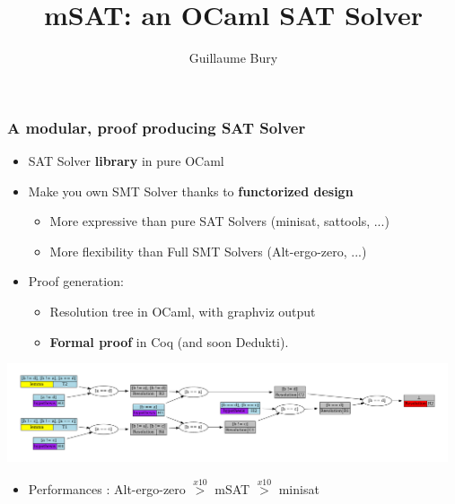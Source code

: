 \documentclass[xcolor={usenames,dvipsnames}]{beamer}
\title{mSAT: an OCaml SAT Solver}
\author{Guillaume Bury}
\institute{Université Paris Diderot; \inria{}; LSV, ENS Cachan}
\begin{document}
\begin{frame}
  \frametitle{A modular, proof producing SAT Solver}

  \begin{itemize}
    \item SAT Solver \textbf{library} in pure OCaml
    \item Make you own SMT Solver thanks to \textbf{functorized design}
      \begin{itemize}
        \item More expressive than pure SAT Solvers (minisat, sattools, ...)
        \item More flexibility than Full SMT Solvers (Alt-ergo-zero, ...)
      \end{itemize}
    \item Proof generation:
      \begin{itemize}
        \item Resolution tree in OCaml, with graphviz output
        \item \textbf{Formal proof} in Coq (and soon Dedukti).
      \end{itemize}
  \end{itemize}
  \hspace*{-1cm}\includegraphics[width=13cm]{proof}
  \begin{itemize}
    \item Performances : Alt-ergo-zero $\overset{x10}{>}$ mSAT $\overset{x10}{>}$ minisat
  \end{itemize}

\end{frame}
\end{document}
